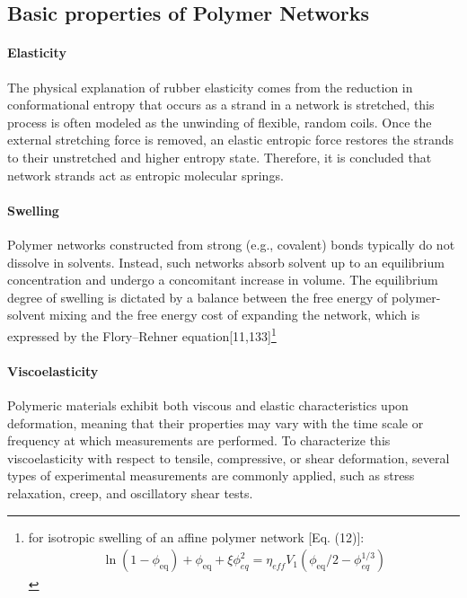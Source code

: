 \subsection{Basic properties of Polymer Networks} 

\paragraph{Elasticity} The physical explanation of rubber elasticity comes from the reduction in conformational entropy that occurs as a strand in a network is stretched, this process is often modeled as the unwinding of flexible, random coils. 
Once the external stretching force is removed, an elastic entropic force restores the strands to their unstretched and higher entropy state. 
Therefore, it is concluded that network strands act as entropic molecular springs\citep{guPolymerNetworksPlastics2020}. 

\paragraph{Swelling} Polymer networks constructed from strong (e.g., covalent) bonds typically do not dissolve in solvents. 
Instead, such networks absorb solvent up to an equilibrium concentration and undergo a concomitant increase in volume. 
The equilibrium degree of swelling is dictated by a balance between the free energy of polymer-solvent mixing and the free energy cost of expanding the network, which is expressed by the Flory–Rehner equation[11,133]\footnote{for isotropic swelling of an affine polymer network [Eq. (12)]:
    \begin{gather*}
        \ln(1-\phi_{\mathrm{eq}}) + \phi_{\mathrm{eq}} + \xi\phi^2_{eq} = \eta_{eff}V_1(\phi_{\mathrm{eq}}/2-\phi^{1/3}_{eq})
    \end{gather*}
}

\paragraph{Viscoelasticity} Polymeric materials exhibit both viscous and elastic characteristics upon deformation, meaning that their properties may vary with the time scale or frequency at which measurements are performed. 
To characterize this viscoelasticity with respect to tensile, compressive, or shear deformation, several types of experimental measurements are commonly applied, such as stress relaxation, creep, and oscillatory shear tests\citep{guPolymerNetworksPlastics2020}. 

